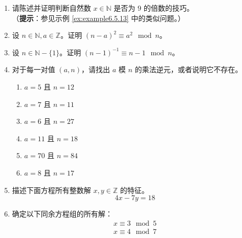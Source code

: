 \begin{enumerate}[label=(\arabic*)]
    \item 请陈述并证明判断自然数 $x \in \mathbb{N}$ 是否为 $9$ 的倍数的技巧。\\
    （\textbf{提示}：参见示例 \ref{ex:example6.5.13} 中的类似问题。）
    \item 设 $n \in \mathbb{N}, a \in \mathbb{Z}$。证明 $ (n-a)^2 \equiv a^2 \mod n$。
    \item 设 $n \in \mathbb{N} - \{1\}$。证明 $ (n-1)^{-1} \equiv n - 1 \mod n$。
    \item 对于每一对值 $(a, n)$，请找出 $a$ 模 $n$ 的乘法逆元，或者说明它不存在。
    \begin{enumerate}[label=(\alph*)]
        \item $a = 5$ 且 $n = 12$
        \item $a = 7$ 且 $n = 11$
        \item $a = 6$ 且 $n = 27$
        \item $a = 11$ 且 $n = 18$
        \item $a = 70$ 且 $n = 84$
        \item $a = 8$ 且 $n = 17$
    \end{enumerate}
    \item 描述下面方程所有整数解 $x, y \in \mathbb{Z}$ 的特征。
        \[4x - 7y = 18\]
    \item 确定以下同余方程组的所有解：
        \begin{align*}
            x \equiv 3 \mod 5 \\
            x \equiv 4 \mod 7
        \end{align*}
\end{enumerate}